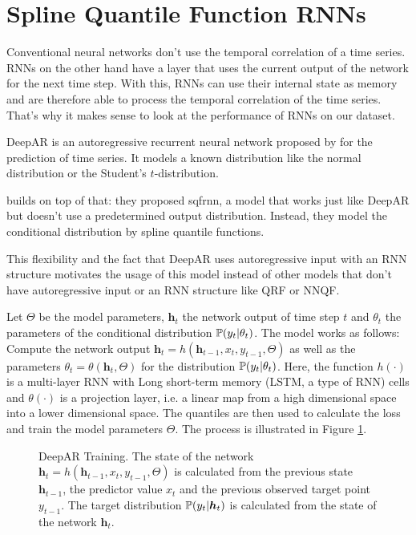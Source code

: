 \section{Spline Quantile Function RNNs}
\label{sec:sqf-rnn}

Conventional neural networks don't use the temporal correlation of a time series. 
RNNs on the other hand have a layer that uses the current output of the network for the 
next time step. With this, RNNs can use their internal state as memory and 
are therefore able to process the temporal correlation of the time series. 
That's why it makes sense to look at the performance of RNNs on our dataset.

DeepAR is an autoregressive recurrent neural network proposed by 
\Textcite{Salinas2017} for the prediction of time series. It models 
a known distribution like the normal distribution or the Student's \(t\)-distribution. 

\Textcite{Gasthaus2019} builds on top of that: they proposed \gls{sqfrnn}, 
a model that works just like DeepAR but doesn't use a predetermined output 
distribution. Instead, they model the conditional distribution 
by spline quantile functions. 

This flexibility and the fact that DeepAR uses autoregressive input with an RNN structure 
motivates the usage of this model instead of other models that don't 
have autoregressive input or an RNN structure like QRF or NNQF.

Let \(\Theta\) be the model parameters, \(\boldsymbol{h}_t\) the network output of 
time step \(t\) and \(\theta_t\) the parameters of the conditional distribution \(\P(y_t | \theta_t)\).
The model works as follows:
Compute the network output \(\boldsymbol{h}_t = h(\boldsymbol{h}_{t-1}, x_t, y_{t-1}, \Theta)\) 
as well as the parameters \(\theta_t = \theta(\boldsymbol{h}_t, \Theta)\) for the distribution
\(\P(y_t | \theta_t)\). 
Here, the function \(h(\cdot)\) is a multi-layer RNN with 
Long short-term memory (LSTM, a type of RNN) cells and \(\theta(\cdot)\) is a projection layer, 
i.e. a linear map from a high dimensional space into a lower dimensional space. 
The quantiles are then used to calculate the loss and train the model parameters \(\Theta\).
The process is illustrated in Figure \ref{fig:deepar-training}. 

\begin{figure}[h]%
    \centering
    
    \caption[DeepAR Training]{DeepAR Training. 
    The state of the network \(\boldsymbol{h}_t = h(\boldsymbol{h}_{t-1}, x_t, y_{t-1}, \Theta)\) 
    is calculated from the previous state \(\boldsymbol{h}_{t-1}\), 
    the predictor value \(x_t\) and the previous observed target point \(y_{t-1}\). 
    The target distribution \(\P(y_t | \boldsymbol{h}_t)\) 
    is calculated from the state of the network \(\boldsymbol{h}_t\).}%
    \label{fig:deepar-training}%
\end{figure}

